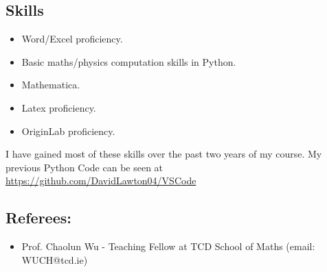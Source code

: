 \documentclass{article}
\begin{document}
\subsection{Skills}
\begin{itemize}
\item Word/Excel proficiency.
\item Basic maths/physics computation skills in Python.
\item Mathematica.
\item Latex proficiency.
\item OriginLab proficiency. 
\end{itemize}
I have gained most of these skills over the past two years of my course. My previous Python Code can be seen at \url{https://github.com/DavidLawton04/VSCode}
\subsection{Referees:}
\begin{itemize}
\item Prof. Chaolun Wu - Teaching Fellow at TCD School of Maths (email: WUCH@tcd.ie)
\end{itemize}
\end{document}
